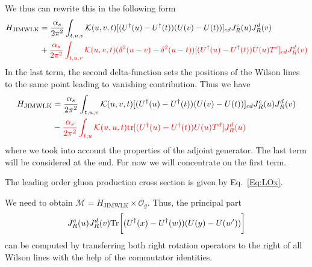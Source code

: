 \documentclass[10pt]{article}
\numberwithin{equation}{section}
\begin{document}
We thus can rewrite this in the following form 
\begin{align}
\label{Eq:HLOComm}
H_{\text{JIMWLK}} &= \frac{\alpha_s}{2 \pi^2} \int_{t,u,v} 
{\cal K}(u, v, t)
[ (U^\dagger(u)  - U^\dagger(t)) (U(v)  - U(t) ) ]_{cd}
J_R ^c(u)
J_R ^d(v)
\nonumber \\ &+ {\color{red}
\frac{\alpha_s}{2 \pi^2} \int_{t,u,v} 
{\cal K}(u, v, t)
(\delta^2(u-v) - \delta^2(u-t))
[ (U^\dagger(u)  - U^\dagger(t)) U(u) T^c  ]_{cd}
J_R ^d(v) } 
\end{align}
In the last term,  the second delta-function sets the positions of the Wilson lines to the same point leading to vanishing contribution. Thus we have 
\begin{align}
\label{Eq:HLOfinal}
H_{\text{JIMWLK}} &= \frac{\alpha_s}{2 \pi^2} \int_{t,u,v} 
{\cal K}(u, v, t)
[ (U^\dagger(u)  - U^\dagger(t)) (U(v)  - U(t) ) ]_{cd}
J_R ^c(u)
J_R ^d(v)
\nonumber \\ &-  {\color{red}
\frac{\alpha_s}{2 \pi^2} \int_{t,u} 
{\cal K}(u, u, t)
{\rm tr}[ (U^\dagger(u)  - U^\dagger(t)) U(u) T^d  ]
J_R ^d(u) } 
\end{align}
where we took into account the properties of the adjoint generator. 
The last term  will be  considered at the end. For now we will concentrate on the first term. 

The leading order gluon production cross section is given by Eq.~\eqref{Eq:LOx}.


We need to obtain $\mathcal{M} = H_{\text{JIMWLK}}\times \mathcal{O}_{g}$. Thus, the principal part
\begin{equation}
    J_R^c(u) J_R^d(v) {\rm Tr}  \bigg[( U^\dagger(x) - U^\dagger(w) )( U(y) - U(w') )\bigg] 
\end{equation}
can be computed by transferring both right rotation operators to the right of all Wilson lines with the help of the commutator identities. 
\end{document}
